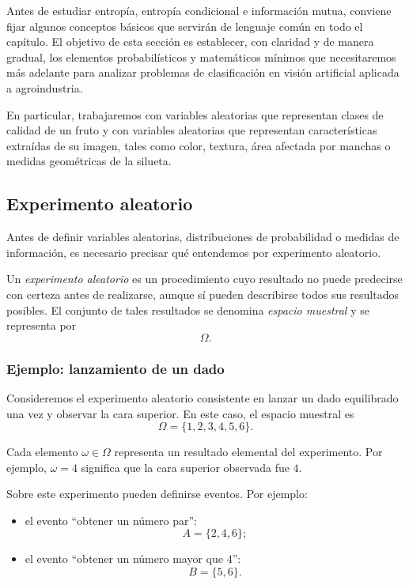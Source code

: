 \documentclass{article}
\begin{document}
Antes de estudiar entropía, entropía condicional e información mutua, conviene fijar algunos conceptos básicos que servirán de lenguaje común en todo el capítulo. El objetivo de esta sección es establecer, con claridad y de manera gradual, los elementos probabilísticos y matemáticos mínimos que necesitaremos más adelante para analizar problemas de clasificación en visión artificial aplicada a agroindustria.

En particular, trabajaremos con variables aleatorias que representan clases de calidad de un fruto y con variables aleatorias que representan características extraídas de su imagen, tales como color, textura, área afectada por manchas o medidas geométricas de la silueta.

\subsection{Experimento aleatorio}

Antes de definir variables aleatorias, distribuciones de probabilidad o medidas de información, es necesario precisar qué entendemos por experimento aleatorio.

Un \textit{experimento aleatorio} es un procedimiento cuyo resultado no puede predecirse con certeza antes de realizarse, aunque sí pueden describirse todos sus resultados posibles. El conjunto de tales resultados se denomina \textit{espacio muestral} y se representa por
\[
\Omega.
\]

\subsubsection*{Ejemplo: lanzamiento de un dado}

Consideremos el experimento aleatorio consistente en lanzar un dado equilibrado una vez y observar la cara superior. En este caso, el espacio muestral es
\[
\Omega=\{1,2,3,4,5,6\}.
\]

Cada elemento \(\omega \in \Omega\) representa un resultado elemental del experimento. Por ejemplo, \(\omega=4\) significa que la cara superior observada fue \(4\).

Sobre este experimento pueden definirse eventos. Por ejemplo:

\begin{itemize}
\item el evento ``obtener un número par'':
\[
A=\{2,4,6\};
\]

\item el evento ``obtener un número mayor que \(4\)'':
\[
B=\{5,6\}.
\]
\end{itemize}
\end{document}
